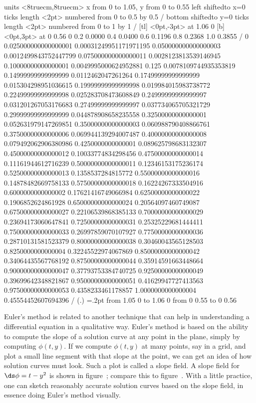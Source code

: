 \figure
\vbox{\beginpicture
\normalgraphs
\sevenpoint
\setcoordinatesystem units <8truecm,8truecm>
\setplotarea x from 0 to 1.05, y from 0 to 0.55
\axis left shiftedto x=0 ticks length <2pt> numbered from 0 to 0.5 by 0.5 /
\axis bottom shiftedto y=0 ticks length <2pt> numbered from 0 to 1 by 1 /
 [tl] <0pt,-3pt> at 1.06 0
 [b] <0pt,3pt> at 0 0.56
\setlinear
{} 0
0.2 0.0000
0.4 0.0400
0.6 0.1196
0.8 0.2368
1.0 0.3855 /
\setquadratic
{}  0  
0.025000000000000001  0.00031249951171971195 
0.050000000000000003  0.0012499843752447799  
0.075000000000000011 0.0028123813539146945  
0.10000000000000001 0.0049995000624952881  
0.125  0.0078109744935353819 
0.14999999999999999  0.0112462047261264  
0.17499999999999999 0.015304298951036615  
0.19999999999999998  0.019984015983738772 
0.22499999999999998  0.025283708473608849  
0.24999999999999997 0.031201267053176683  
0.27499999999999997  0.037734065705321729 
0.29999999999999999  0.044878908658235558  
0.32500000000000001 0.052631979147269851  
0.35000000000000003  0.060988790408866761 
0.37500000000000006  0.069944139294007487  
0.40000000000000008 0.079492062906380986  
0.4250000000000001  0.089625798683132307 
0.45000000000000012  0.10033774834298456  
0.47500000000000014 0.11161944612716239  
0.50000000000000011  0.12346153175236174 
0.52500000000000013  0.1358537284815772  
0.55000000000000016 0.14878482669758133  
0.57500000000000018  0.16224267333504916 
0.6000000000000002  0.17621416749066984  
0.62500000000000022 0.1906852624861928  
0.65000000000000024  0.20564097460749087 
0.67500000000000027  0.22106539868385133  
0.70000000000000029 0.23694173060647841  
0.72500000000000031  0.25325229681444411 
0.75000000000000033  0.26997859070107927  
0.77500000000000036 0.28710131581523379  
0.80000000000000038  0.30460043565128503 
0.8250000000000004  0.32245522974067869  
0.85000000000000042 0.34064435567768192  
0.87500000000000044  0.35914591663448664 
0.90000000000000047  0.37793753384740725  
0.92500000000000049 0.39699642348821867  
0.95000000000000051  0.41629947727413563 
0.97500000000000053  0.4358233461178857  
1.0000000000000004 0.45554452607694396 /
\setplotsymbol ({\teeny.})
\plotsymbolspacing=.2pt
\arrow <4pt> [0.35, 1] from 1.05 0 to 1.06 0
\arrow <4pt> [0.35, 1] from 0 0.55 to 0 0.56
\endpicture}

Euler's method is related to another technique that can help in
understanding a differential equation in a qualitative way. Euler's
method is based on the ability to compute the slope of a solution
curve at any point in the plane, simply by computing $\phi(t,y)$. If
we compute $\phi(t,y)$ at many points, say in a grid, and plot a small
line segment with that slope at the point, we can get an idea of how
solution curves must look. Such a plot is called a 
{\dfont slope field}. A slope field for 
$\ds\phi=t-y^2$ is shown in figure~; compare
this to figure~.
With a little practice, one can sketch reasonably accurate solution
curves based on the slope field, in essence doing Euler's method
visually.

